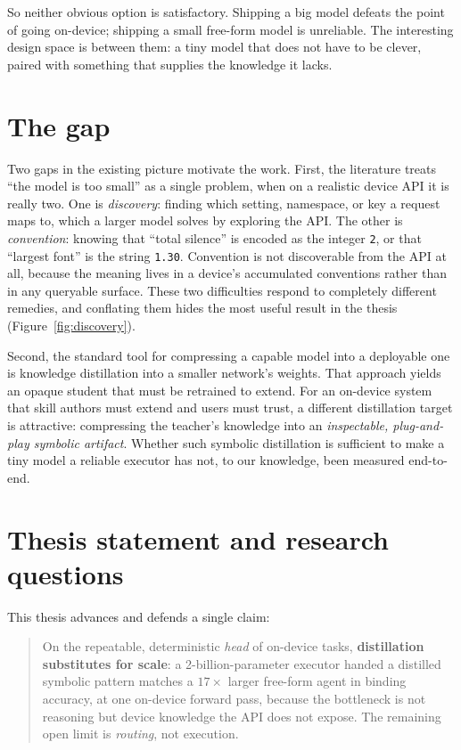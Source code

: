 So neither obvious option is satisfactory. Shipping a big model defeats the point
of going on-device; shipping a small free-form model is unreliable. The
interesting design space is between them: a tiny model that does not have to be
clever, paired with something that supplies the knowledge it lacks.

\section{The gap}
\label{sec:gap}

Two gaps in the existing picture motivate the work. First, the literature treats
``the model is too small'' as a single problem, when on a realistic device API it
is really two. One is \emph{discovery}: finding which setting, namespace, or key a
request maps to, which a larger model solves by exploring the API. The other is
\emph{convention}: knowing that ``total silence'' is encoded as the integer
\texttt{2}, or that ``largest font'' is the string \texttt{1.30}. Convention is
not discoverable from the API at all, because the meaning lives in a device's
accumulated conventions rather than in any queryable surface. These two
difficulties respond to completely different remedies, and conflating them hides
the most useful result in the thesis (Figure~\ref{fig:discovery}).

Second, the standard tool for compressing a capable model into a deployable one
is knowledge distillation into a smaller network's weights. That approach yields
an opaque student that must be retrained to extend. For an on-device system that
skill authors must extend and users must trust, a different distillation target
is attractive: compressing the teacher's knowledge into an \emph{inspectable,
plug-and-play symbolic artifact}. Whether such symbolic distillation is
sufficient to make a tiny model a reliable executor has not, to our knowledge,
been measured end-to-end.

\section{Thesis statement and research questions}
\label{sec:statement}

This thesis advances and defends a single claim:

\begin{quote}
On the repeatable, deterministic \emph{head} of on-device tasks, \textbf{distillation
substitutes for scale}: a 2-billion-parameter executor handed a distilled
symbolic pattern matches a $17\times$ larger free-form agent in binding accuracy,
at one on-device forward pass, because the bottleneck is not reasoning but device
knowledge the API does not expose. The remaining open limit is \emph{routing},
not execution.
\end{quote}

